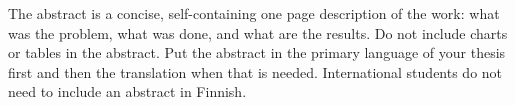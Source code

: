 The abstract is a concise, self-containing one page description of the work: what was the problem, what was done, and what are the results. Do not include charts or tables in the abstract. Put the abstract in the primary language of your thesis first and then the translation when that is needed. International students do not need to include an abstract in Finnish.